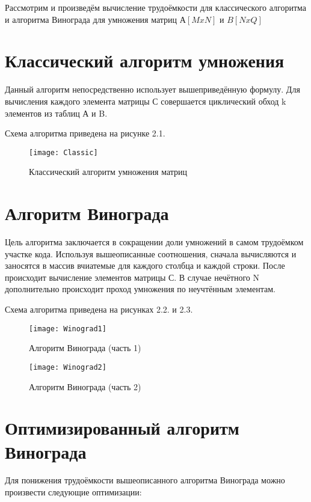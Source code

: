 Рассмотрим и произведём вычисление трудоёмкости для классического алгоритма и алгоритма Винограда для умножения матриц $ А[MxN] $ и $ B[NxQ] $

\section{Классический алгоритм умножения}
Данный алгоритм непосредственно использует вышеприведённую формулу. Для вычисления каждого элемента матрицы С 
совершается циклический обход k элементов из таблиц А и B.

Схема алгоритма приведена на рисунке 2.1.
\begin{figure}[h]
	\begin{center}
		{\texttt{[image: Classic]}}
		\caption{Классический алгоритм умножения матриц}
	\end{center}
\end{figure}

\section{Алгоритм Винограда}
Цель алгоритма заключается в сокращении доли умножений в самом трудоёмком участке кода. Используя вышеописанные соотношения, сначала вычисляются и заносятся в массив вчиатемые для каждого столбца и каждой строки. После происходит вычисление элементов матрицы С. В случае нечётного N дополнительно происходит проход умножения по неучтённым элементам.

Схема алгоритма приведена на рисунках 2.2. и 2.3.
\begin{figure}[h]
	\begin{center}
		{\texttt{[image: Winograd1]}}
		\caption{Алгоритм Винограда (часть 1)}
	\end{center}
\end{figure}
\begin{figure}[h]
	\begin{center}
		{\texttt{[image: Winograd2]}}
		\caption{Алгоритм Винограда (часть 2)}
	\end{center}
\end{figure}


\section{Оптимизированный алгоритм Винограда}
Для понижения трудоёмкости вышеописанного алгоритма Винограда можно произвести следующие оптимизации:

